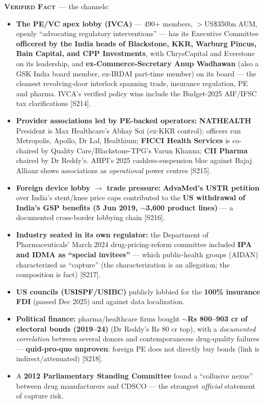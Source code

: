 \documentclass[11pt,a4paper]{article}
\newcommand{\VF}{\textcolor{vfcol}{\textsc{\textbf{Verified Fact}}}}
\newcommand{\cs}[1]{\textnormal{[#1]}}
\begin{document}
\VF\ --- the channels:
\begin{itemize}[leftmargin=1.4em,itemsep=2pt]
\item \textbf{The PE/VC apex lobby (IVCA)} --- 490$+$ members, $>$US\$350bn AUM, openly ``advocating regulatory interventions'' --- has its Executive Committee \textbf{officered by the India heads of Blackstone, KKR, Warburg Pincus, Bain Capital, and CPP Investments}, with ChrysCapital and Everstone on its leadership, and \textbf{ex-Commerce-Secretary Anup Wadhawan} (also a GSK India board member, ex-IRDAI part-time member) on its board --- the cleanest revolving-door interlock spanning trade, insurance regulation, PE and pharma. IVCA's verified policy wins include the Budget-2025 AIF/IFSC tax clarifications \cs{S214}.
\item \textbf{Provider associations led by PE-backed operators:} \textbf{NATHEALTH} President is Max Healthcare's Abhay Soi (ex-KKR control); officers run Metropolis, Apollo, Dr Lal, Healthium; \textbf{FICCI Health Services} is co-chaired by Quality Care/Blackstone-TPG's Varun Khanna; \textbf{CII Pharma} chaired by Dr Reddy's. AHPI's 2025 cashless-suspension bloc against Bajaj Allianz shows associations as \emph{operational} power centres \cs{S215}.
\item \textbf{Foreign device lobby $\rightarrow$ trade pressure:} \textbf{AdvaMed's USTR petition} over India's stent/knee price caps contributed to the \textbf{US withdrawal of India's GSP benefits (5 Jun 2019, $\sim$3{,}600 product lines)} --- a documented cross-border lobbying chain \cs{S216}.
\item \textbf{Industry seated in its own regulator:} the Department of Pharmaceuticals' March 2024 drug-pricing-reform committee included \textbf{IPA and IDMA as ``special invitees''} --- which public-health groups (AIDAN) characterized as ``capture'' (the characterization is an allegation; the composition is fact) \cs{S217}.
\item \textbf{US councils (USISPF/USIBC)} publicly lobbied for the \textbf{100\% insurance FDI} (passed Dec 2025) and against data localization.
\item \textbf{Political finance:} pharma/healthcare firms bought \textbf{$\sim$Rs 800--903 cr of electoral bonds (2019--24)} (Dr Reddy's Rs 80 cr top), with a \emph{documented correlation} between several donors and contemporaneous drug-quality failures --- \textbf{quid-pro-quo unproven}; foreign PE does not directly buy bonds (link is indirect/attenuated) \cs{S218}.
\item A \textbf{2012 Parliamentary Standing Committee} found a ``collusive nexus'' between drug manufacturers and CDSCO --- the strongest \emph{official} statement of capture risk.
\end{itemize}
\end{document}
